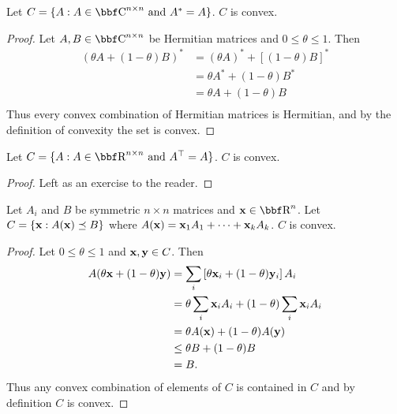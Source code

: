 \documentclass{article}
\begin{document}
\begin{example}
    \label{ex:hermitian-convex}
    Let $C = \{A : A\in\CC^{n\times n} \text{ and } A^* = A\}$. $C$ is
    convex.
\end{example}
\begin{proof}
    Let $A,B\in\CC^{n\times n}$ be Hermitian matrices and $0\leq\theta\leq1$.
    Then
    \begin{align}
        (\theta A + (1-\theta) B)^* &= (\theta A)^* + \left[(1-\theta)B\right]^*\\
        &= \theta A^* + (1-\theta) B^*\\
        &= \theta A + (1-\theta) B \tag{because $A^*=A$ and $B^*=B$}\\
    \end{align}
    Thus every convex combination of Hermitian matrices is Hermitian,
    and by the definition of convexity the set is convex.
\end{proof}

\begin{corollary}
    Let $C = \{A : A\in\RR^{n\times n} \text{ and } A^\T = A\}$. $C$ is
    convex.
\end{corollary}
\begin{proof}
    Left as an exercise to the reader.
\end{proof}

\begin{example}
    Let $A_i$ and $B$ be symmetric $n\times n$ matrices and
    $\xx\in\RR^n$.
    Let $C = \{{\bf x} : A({\bf x}) \preceq B\}$ where $A({\bf x}) = {\bf x}_1A_1 +
    \dots + {\bf x}_kA_k$. $C$ is convex.
\end{example}
\begin{proof}
    Let $0\leq\theta\leq1$ and ${\bf x}, {\bf y} \in C$. Then
    \begin{align*}
        A(\theta{\bf x} + (1-\theta){\bf y}) &= \sum_i \left[ \theta{\bf x}_i + (1-\theta){\bf y}_i \right]A_i\\
        &= \theta\sum_i {\bf x}_i A_i + (1-\theta)\sum_i {\bf x}_i A_i\\
        &= \theta A({\bf x}) + (1-\theta) A({\bf y})\\
        &\leq \theta B + (1-\theta) B\\
        &= B.
    \end{align*}
    Thus any convex combination of elements of $C$ is contained
    in $C$ and by definition $C$ is convex.
\end{proof}
\end{document}
